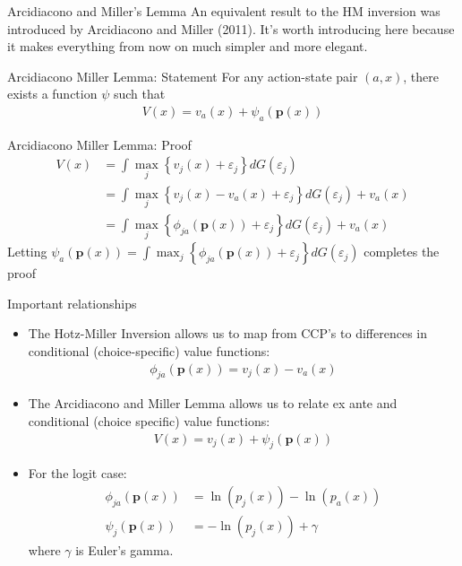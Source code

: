\begin{frame}{Arcidiacono and Miller's Lemma}
An equivalent result to the HM inversion was introduced by Arcidiacono and Miller (2011). 
It's worth introducing here because it makes everything from now on much simpler
and more elegant.
\begin{block}{Arcidiacono Miller Lemma: Statement}
For any action-state pair $\left(a,x\right)$, there exists a function
$\psi$ such that 
\begin{align*}
V\left(x\right)=v_{a}\left(x\right)+\psi_{a}\left(\symbf{p}\left(x\right)\right)
\end{align*}
\end{block}
\end{frame}

\begin{frame}{Arcidiacono Miller Lemma: Proof}
\begin{align*}
V\left(x\right) &=  \int\max_{j}\left\{ v_{j}\left(x\right)+\varepsilon_{j}\right\} dG\left(\varepsilon_{j}\right)\\
 &= \int\max_{j}\left\{ v_{j}\left(x\right)-v_{a}\left(x\right)+\varepsilon_{j}\right\} dG\left(\varepsilon_{j}\right)+v_{a}\left(x\right)\\
 &=  \int\max_{j}\left\{ \phi_{ja}\left(\symbf{p}\left(x\right)\right)+\varepsilon_{j}\right\} dG\left(\varepsilon_{j}\right)+v_{a}\left(x\right)
\end{align*}
Letting $\psi_{a}\left(\symbf{p}\left(x\right)\right)=\int\max_{j}\left\{ \phi_{ja}\left(\symbf{p}\left(x\right)\right)+\varepsilon_{j}\right\} dG\left(\varepsilon_{j}\right)$ completes the proof
\end{frame}

\begin{frame}{Important relationships}
\small
\begin{itemize}
\item The Hotz-Miller Inversion allows us to map from CCP's to differences
in conditional (choice-specific) value functions:
\begin{align*}
\phi_{ja}\left(\symbf{p}\left(x\right)\right)=v_{j}\left(x\right)-v_{a}\left(x\right)
\end{align*}
\item The Arcidiacono and Miller Lemma allows us to relate ex ante and conditional (choice specific)
value functions: 
\begin{align*}
V\left(x\right)=v_{j}\left(x\right)+\psi_{j}\left(\symbf{p}\left(x\right)\right)
\end{align*}
\item For the logit case:
\begin{align*}
\phi_{ja}\left(\symbf{p}\left(x\right)\right) & = \ln\left(p_{j}\left(x\right)\right)-\ln\left(p_{a}\left(x\right)\right)\\
\psi_{j}\left(\symbf{p}\left(x\right)\right) & =  -\ln\left(p_{j}\left(x\right)\right)+\gamma
\end{align*}
where $\gamma$ is Euler's gamma.
\end{itemize}
\end{frame}



